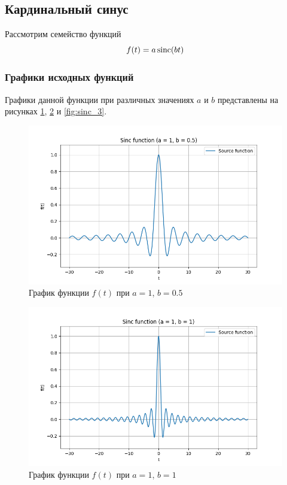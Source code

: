 \subsection{Кардинальный синус}

Рассмотрим семейство функций
\begin{equation}
    f(t) = a \operatorname{sinc}(bt)
    \label{eq:sinc_function}
\end{equation}

\subsubsection{Графики исходных функций}
Графики данной функции при различных значениях $a$ и $b$ представлены на рисунках \ref{fig:sinc_1}, \ref{fig:sinc_2} и \ref{fig:sinc_3}.

\begin{figure}[ht!]
    \centering
    \includegraphics[width=\textwidth]{media/sinc_1.png}
    \caption{График функции $f(t)$ при $a = 1$, $b = 0.5$}
    \label{fig:sinc_1}
\end{figure}

\begin{figure}[ht!]
    \centering
    \includegraphics[width=\textwidth]{media/sinc_2.png}
    \caption{График функции $f(t)$ при $a = 1$, $b = 1$}
    \label{fig:sinc_2}
\end{figure}

